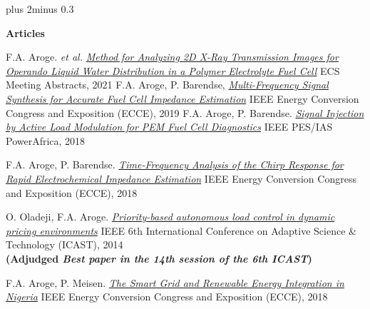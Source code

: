 \documentclass{article} %
\def\bf{\bfseries}
\def\sf{\sffamily}
\def\sl{\slshape}
\newlength\sidebarwidth
\newcommand{\smalltopic}[2]%
	 {\pagebreak[2]%
	 \vskip 1\baselineskip plus 2\baselineskip minus 0.3\baselineskip
	 \begin{minipage}{\textwidth}
         \phantomsection\addcontentsline{toc}{subsection}{#1}%
         \nopagebreak\hspace{0in}%
         \nopagebreak\begin{minipage}[t]{\sidebarwidth - .2cm}
         \raggedleft \bf\sf %
	 \textcolor{dark_blue}{\large #1}%
	 \end{minipage}%
	 \hfill
	 \begin{minipage}[t]{\linewidth - \sidebarwidth}
	 \nopagebreak{%
	    \rule{\linewidth}{.5pt}%
	    \vspace{.1\baselineskip}%
	    }%
	    #2
	 \end{minipage}
	 \end{minipage}}
\begin{document}
\smalltopic{Articles}{
  \begin{itemize}[leftmargin=0ex, itemsep=0ex, labelindent=-4ex, parsep=.5ex]

    \publication F.A. Aroge. {\it et al.}
      \href{https://iopscience.iop.org/article/10.1149/MA2021-02361036mtgabs/meta} 
      {\sl Method for Analyzing 2D X-Ray Transmission Images for Operando Liquid Water
Distribution in a Polymer Electrolyte Fuel Cell}
      ECS Meeting Abstracts, 2021
    \publication F.A. Aroge, P. Barendse, 
      \href{https://doi.org/10.1109/ECCE.2019.8913156}{\sl Multi-Frequency Signal Synthesis for Accurate Fuel Cell Impedance Estimation}
      IEEE Energy Conversion Congress and Exposition (ECCE), 2019
    \publication F.A. Aroge, P. Barendse.
       \href{https://doi.org/10.1109/PowerAfrica.2018.8521159}{\sl Signal Injection by Active Load Modulation for PEM Fuel Cell Diagnostics}
      IEEE PES/IAS PowerAfrica, 2018
      
    \publication F.A. Aroge, P. Barendse.
       \href{http://dx.doi.org/10.1109/ECCE.2018.8558129}{\sl Time-Frequency Analysis of the Chirp Response for Rapid Electrochemical Impedance Estimation}
      IEEE Energy Conversion Congress and Exposition (ECCE), 2018
      
    \publication O. Oladeji, F.A. Aroge.
       \href{https://doi.org/10.1109/ICASTECH.2014.7068063}{\sl Priority-based autonomous load control in dynamic pricing environments}
      IEEE 6th International Conference on Adaptive Science \& Technology (ICAST), 2014 \\
      {\bf (Adjudged 
        {\it \bf Best paper in the 14th session of the 6th ICAST})}
        
    \publication F.A. Aroge, P. Meisen.
       \href{https://www.geni.org/globalenergy/research/the-smart-grid-and-renewable-energy-integration-in-nigeria-2014/the-smart-grid-and-renewable-energy-integration-in-nigeria-2014.pdf}{\sl The Smart Grid and Renewable Energy Integration in Nigeria}
      IEEE Energy Conversion Congress and Exposition (ECCE), 2018
  \end{itemize}
}
\end{document}
